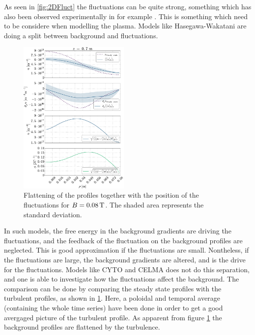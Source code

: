 As seen in \cref{fig:2DFluct} the fluctuations can be quite strong, something which has also been observed experimentally in for example \cite{Burin2005}.
This is something which need to be considere when modelling the plasma.
Models like Hasegawa-Wakatani \cite{Hasegawa1987,Holland2007} are doing a split between background and fluctuations.
%
\begin{figure}
    \begin{center}
    \includegraphics[width=0.48\textwidth]{fig/results/posOfFluct/posOfFluctB008}
    \end{center}
    \caption{Flattening of the profiles together with the position of the fluctuations for $B=0.08\, \text{T}$.
        The shaded area represents the standard deviation.
    }
    \label{fig:posOfFluct008}
\end{figure}
%
In such models, the free energy in the background gradients are driving the fluctuations, and the feedback of the fluctuation on the background profiles are neglected.
This is good approximation if the fluctuations are small.
Nontheless, if the fluctuations are large, the background gradients are altered, and is the drive for the fluctuations.
Models like CYTO \cite{Naulin2008,Windisch2011a,Windisch2011b} and CELMA does not do this separation, and one is able to investigate how the fluctuations affect the background.
The comparison can be done by comparing the steady state profiles with the turbulent profiles, as shown in \cref{fig:posOfFluct008}.
Here, a poloidal and temporal average (containing the whole time series) have been done in order to get a good avergaged picture of the turbulent profile.
As apparent from figure \cref{fig:posOfFluct008} the background profiles are flattened by the turbulence.

